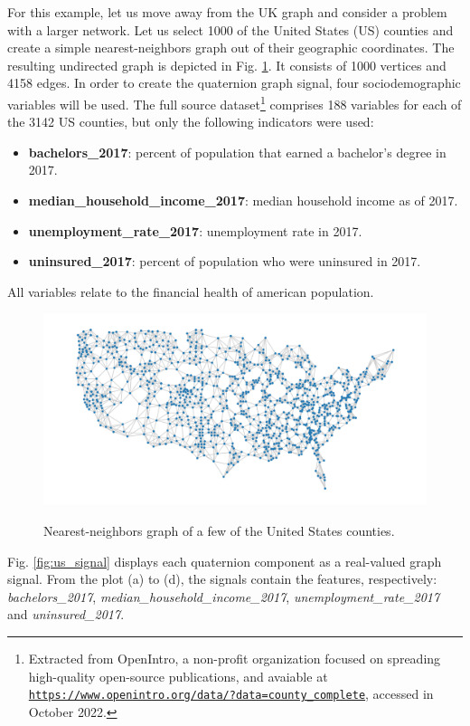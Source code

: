 For this example, let us move away from the UK graph and consider a problem with a larger network. Let us select 1000 of the United States (US) counties and create a simple nearest-neighbors graph out of their geographic coordinates. The resulting undirected graph is depicted in Fig. \ref{fig:us_graph}. It consists of 1000 vertices and 4158 edges. In order to create the quaternion graph signal, four sociodemographic variables will be used. The full source dataset\footnote{Extracted from OpenIntro, a non-profit organization focused on spreading high-quality open-source publications, and avaiable at \texttt{\url{https://www.openintro.org/data/?data=county_complete}}, accessed in October 2022.} comprises 188 variables for each of the 3142 US counties, but only the following indicators were used:
\begin{itemize}[noitemsep]
    \item \textbf{bachelors\_2017}: percent of population that earned a bachelor's degree in 2017.
    \item \textbf{median\_household\_income\_2017}: median household income as of 2017.
    \item \textbf{unemployment\_rate\_2017}: unemployment rate in 2017.
    \item \textbf{uninsured\_2017}: percent of population who were uninsured in 2017.
\end{itemize}
All variables relate to the financial health of american population.

\begin{figure}
    \centering
    \caption{Nearest-neighbors graph of a few of the United States counties.}
    \includegraphics[width=0.8\linewidth]{Figures/usa_example/us_graph.pdf}
    \floatsource
    \label{fig:us_graph}
\end{figure}

Fig. \ref{fig:us_signal} displays each quaternion component as a real-valued graph signal. From the plot (a) to (d), the signals contain the features, respectively: \textit{bachelors\_2017}, \textit{median\_\-household\_\-income\_2017}, \textit{unemployment\_rate\_2017} and \textit{uninsured\_2017}.

